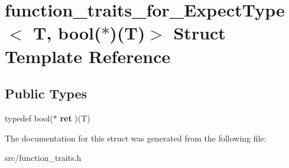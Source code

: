 \hypertarget{structfunction__traits__for___expect_type_3_01_t_00_01bool_07_5_08_07_t_08_4}{\section{function\-\_\-traits\-\_\-for\-\_\-\-Expect\-Type$<$ T, bool($\ast$)(T)$>$ Struct Template Reference}
\label{structfunction__traits__for___expect_type_3_01_t_00_01bool_07_5_08_07_t_08_4}
}
\subsection*{Public Types}
\begin{DoxyCompactItemize}
\item 
\hypertarget{structfunction__traits__for___expect_type_3_01_t_00_01bool_07_5_08_07_t_08_4_a256c85a4990598ad0ae072a70f02fc5a}{typedef bool($\ast$ {\bfseries ret} )(T)}\label{structfunction__traits__for___expect_type_3_01_t_00_01bool_07_5_08_07_t_08_4_a256c85a4990598ad0ae072a70f02fc5a}

\end{DoxyCompactItemize}


The documentation for this struct was generated from the following file\-:\begin{DoxyCompactItemize}
\item 
src/function\-\_\-traits.\-h\end{DoxyCompactItemize}

